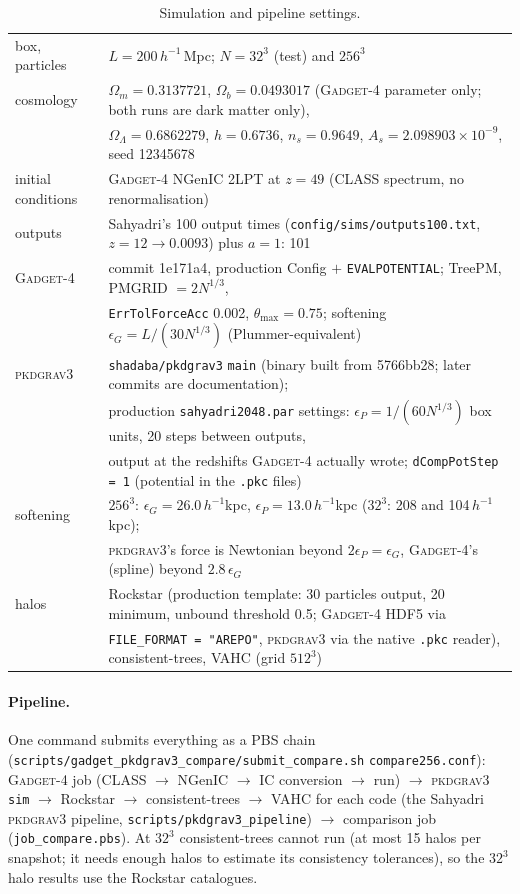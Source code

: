 \documentclass[11pt,a4paper]{article}
\newcommand{\pkd}{\textsc{pkdgrav3}}
\newcommand{\gad}{\textsc{Gadget-4}}
\newcommand{\fp}[1]{\nolinkurl{#1}}
\newcommand{\Mpch}{$h^{-1}$\,Mpc}
\begin{document}
\begin{table}[H]
\centering\small
\begin{tabular}{@{}L{0.17\textwidth}L{0.8\textwidth}@{}}
\toprule
box, particles & $L = 200$\,\Mpch; $N = 32^3$ (test) and $256^3$ \\
cosmology & $\Omega_m = 0.3137721$, $\Omega_b = 0.0493017$ (\gad{} parameter only; both runs are dark matter only),\\
 & $\Omega_\Lambda = 0.6862279$, $h = 0.6736$, $n_s = 0.9649$, $A_s = 2.098903\times10^{-9}$, seed 12345678 \\
initial conditions & \gad{} NGenIC 2LPT at $z = 49$ (CLASS spectrum, no renormalisation) \\
outputs & Sahyadri's 100 output times (\fp{config/sims/outputs100.txt}, $z = 12 \to 0.0093$) plus $a = 1$: 101 \\
\gad{} & commit 1e171a4, production Config $+$ \texttt{EVALPOTENTIAL}; TreePM, PMGRID $= 2N^{1/3}$,\\
 & \texttt{ErrTolForceAcc} 0.002, $\theta_{\max} = 0.75$; softening $\epsilon_G = L/(30 N^{1/3})$ (Plummer-equivalent) \\
\pkd{} & \fp{shadaba/pkdgrav3} \texttt{main} (binary built from 5766bb28; later commits are documentation);\\
 & production \fp{sahyadri2048.par} settings: $\epsilon_P = 1/(60 N^{1/3})$ box units, 20 steps between outputs,\\
 & output at the redshifts \gad{} actually wrote; \fp{dCompPotStep = 1} (potential in the \texttt{.pkc} files) \\
softening & $256^3$: $\epsilon_G = 26.0$\,$h^{-1}$kpc, $\epsilon_P = 13.0$\,$h^{-1}$kpc ($32^3$: 208 and 104\,$h^{-1}$kpc);\\
 & \pkd{}'s force is Newtonian beyond $2\epsilon_P = \epsilon_G$, \gad{}'s (spline) beyond $2.8\,\epsilon_G$ \\
halos & Rockstar (production template: 30 particles output, 20 minimum, unbound threshold 0.5; \gad{} HDF5 via\\
 & \texttt{FILE\_FORMAT = "AREPO"}, \pkd{} via the native \texttt{.pkc} reader), consistent-trees, VAHC (grid $512^3$) \\
\bottomrule
\end{tabular}
\caption{Simulation and pipeline settings.}
\label{tab:setup}
\end{table}

\paragraph{Pipeline.} One command submits everything as a PBS chain
(\fp{scripts/gadget_pkdgrav3_compare/submit_compare.sh} \texttt{compare256.conf}):
\gad{} job (CLASS $\to$ NGenIC $\to$ IC conversion $\to$ run) $\to$ \pkd{} \texttt{sim} $\to$ Rockstar $\to$
consistent-trees $\to$ VAHC for each code (the Sahyadri \pkd{} pipeline, \fp{scripts/pkdgrav3_pipeline}) $\to$
comparison job (\fp{job_compare.pbs}). At $32^3$ consistent-trees cannot run (at most 15 halos per snapshot; it
needs enough halos to estimate its consistency tolerances), so the $32^3$ halo results use the Rockstar catalogues.
\end{document}
